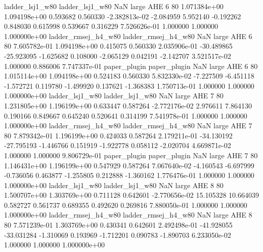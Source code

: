     ladder_lsj1_w80     ladder_lsj1_w80                   NaN      large      AHE                 6 80 1.071384e+00   1.094198e+00      0.593682       0.560330 -2.382813e-02     -2.084959      5.952140    -0.192262       0.848030  0.615998   0.539667     0.316229   7.526626e-01            1.000000        1.000000        1.000000e+00
ladder_rmsej_h4_w80 ladder_rmsej_h4_w80                   NaN      large      AHE                 6 80 7.605782e-01   1.094198e+00      0.415075       0.560330  2.035906e-01    -30.489865    -25.923095    -1.625682       0.108000 -2.065129   0.042191    -2.142707   3.521517e-02            1.000000        0.886006        7.747337e-01
       paper_plugin        paper_plugin                   NaN      large      AHE                 6 80 1.015114e+00   1.094198e+00      0.524183       0.560330  5.832330e-02     -7.227509     -6.451118    -1.572721       0.119780 -1.499920   0.137621    -1.368383   1.750713e-01            1.000000        1.000000        1.000000e+00
    ladder_lsj1_w80     ladder_lsj1_w80                   NaN      large      AHE                 7 80 1.231805e+00   1.196199e+00      0.633447       0.587264 -2.772176e-02      2.976611      7.864130     0.190166       0.849667  0.645240   0.520641     0.314199   7.541978e-01            1.000000        1.000000        1.000000e+00
ladder_rmsej_h4_w80 ladder_rmsej_h4_w80                   NaN      large      AHE                 7 80 7.879342e-01   1.196199e+00      0.424033       0.587264  2.179211e-01    -34.130192    -27.795193    -1.446766       0.151919 -1.922778   0.058112    -2.020704   4.669871e-02            1.000000        1.000000        9.806729e-01
       paper_plugin        paper_plugin                   NaN      large      AHE                 7 80 1.146431e+00   1.196199e+00      0.547929       0.587264  7.067640e-02     -4.160543     -6.697999    -0.736056       0.463877 -1.255805   0.212888    -1.360162   1.776476e-01            1.000000        1.000000        1.000000e+00
    ladder_lsj1_w80     ladder_lsj1_w80                   NaN      large      AHE                 8 80 1.500707e+00   1.303769e+00      0.711128       0.642601 -2.770656e-02     15.105328     10.664039     0.582727       0.561737  0.689355   0.492620     0.269816   7.880050e-01            1.000000        1.000000        1.000000e+00
ladder_rmsej_h4_w80 ladder_rmsej_h4_w80                   NaN      large      AHE                 8 80 7.571239e-01   1.303769e+00      0.430341       0.642601  2.492498e-01    -41.928055    -33.031284    -1.310069       0.193969 -1.712201   0.090783    -1.890703   6.233050e-02            1.000000        1.000000        1.000000e+00
